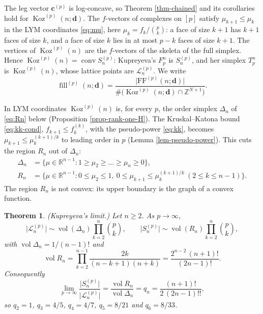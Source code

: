 \documentclass[11pt, a4paper, abstract=yes]{scrartcl}
\theoremstyle{definition}
\theoremstyle{remark}
\theoremstyle{plain}
\newtheorem{theorem}[definition]{Theorem}
\newcommand{\vek}[1]{\boldsymbol{#1}}
\theoremstyle{remark}
\theoremstyle{plain}
\newcommand{\Koz}{\operatorname{Koz}}
\newcommand{\conv}{\operatorname{conv}}
\newcommand{\FF}{\mathrm{FF}}
\newcommand{\vol}{\operatorname{vol}}
\newcommand{\leannone}{\tikz[baseline=-0.6ex]\draw[leannone,line width=0.6pt] (0,0) circle (0.55ex);}
\newcommand{\leanmark}[1]{\leavevmode{\reversemarginpar\marginnote{\raggedleft#1}}}
\begin{document}
The leg vector \(\vek c^{(p)}\) is log-concave, so Theorem \ref{thm-chained} and its corollaries hold
for \(\Koz^{(p)}(n;\vek d)\). The \(f\)-vectors of complexes on \([p]\) satisfy \(\mu_{k+1}\le\mu_k\)
in the LYM coordinates \eqref{eq:mu}, here \(\mu_k=f_k/\binom pk\): a face of size \(k+1\) has \(k+1\) faces of size
\(k\), and a face of size \(k\) lies in at most \(p-k\) faces of size \(k+1\). The vertices of
\(\Koz^{(p)}(n)\) are the \(f\)-vectors of the skeleta of the full simplex. Hence
\(\Koz^{(p)}(n)=\conv S_n^{(p)}\): Kupreyeva's \(F^n_p\) is \(S_n^{(p)}\), and her simplex
\(T^n_p\) is \(\Koz^{(p)}(n)\), whose lattice points are \(\mathcal L_n^{(p)}\). We write
\begin{equation}\label{eq:fill-p}
  \operatorname{fill}^{(p)}(n;\vek d)=\frac{\lvert\FF^{(p)}(n;\vek d)\rvert}
  {\#\bigl(\Koz^{(p)}(n;\vek d)\cap\mathbb Z^{N+1}\bigr)} .
\end{equation}

In LYM coordinates \(\Koz^{(p)}(n)\) is, for every \(p\), the order simplex \(\Delta_n\) of
\eqref{eq:Rn} below (Proposition \ref{prop-rank-one-H}). The Kruskal--Katona bound \eqref{eq:kk-cond},
\(f_{k+1}\le f_k^{(k)}\), with the pseudo-power \eqref{eq:kk}, becomes
\(\mu_{k+1}\le\mu_k^{(k+1)/k}\) to leading order in \(p\) (Lemma \ref{lem-pseudo-power}). This cuts the
region \(R_n\) out of \(\Delta_n\):
\begin{equation}\label{eq:Rn}
\begin{aligned}
  \Delta_n&=\bigl\lbrace\mu\in\mathbb R^{n-1}:1\ge\mu_2\ge\dots\ge\mu_n\ge0\bigr\rbrace,\\
  R_n&=\bigl\lbrace\mu\in\mathbb R^{n-1}:0\le\mu_2\le1,\ 0\le\mu_{k+1}\le\mu_k^{(k+1)/k}
  \ (2\le k\le n-1)\bigr\rbrace .
\end{aligned}
\end{equation}
The region \(R_n\) is not convex: its upper boundary is the graph of a convex function.

\begin{theorem}
\leanmark{\leannone}(\emph{Kupreyeva's limit.}) Let \(n\ge2\). As \(p\to\infty\),
\[
  \bigl\lvert\mathcal L_n^{(p)}\bigr\rvert\sim\vol(\Delta_n)\prod_{k=2}^n\binom pk,\qquad
  \bigl\lvert S_n^{(p)}\bigr\rvert\sim\vol(R_n)\prod_{k=2}^n\binom pk,
\]
with \(\vol\Delta_n=1/(n-1)!\) and
\[
  \vol R_n=\prod_{k=2}^{n-1}\frac{2k}{(n-k+1)(n+k)}=\frac{2^{n-2}\,(n+1)!}{(2n-1)!}.
\]
Consequently
\begin{equation}\label{eq:qn}
  \lim_{p\to\infty}\frac{\lvert S_n^{(p)}\rvert}{\lvert\mathcal L_n^{(p)}\rvert}
  =\frac{\vol R_n}{\vol\Delta_n}=q_n=\frac{(n+1)!}{2\,(2n-1)!!},
\end{equation}
so \(q_2=1\), \(q_3=4/5\), \(q_4=4/7\), \(q_5=8/21\) and \(q_6=8/33\).
\label{thm-kupreyeva-limit}
\end{theorem}
\end{document}
